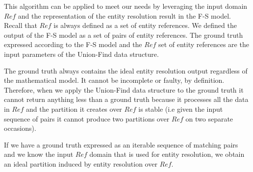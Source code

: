 This algorithm can be applied to meet our needs by leveraging the input domain
$Ref$ and the representation of the entity resolution result in the F-S model.
Recall that $Ref$ is always defined as a set of entity references.
We defined the output of the F-S model as a set of pairs of entity
references.
The ground truth expressed according to the F-S model and the $Ref$ set of
entity references are the input parameters of the Union-Find data structure.

The ground truth always contains the ideal entity resolution output
regardless of the mathematical model.
It cannot be incomplete or faulty, by definition.
Therefore, when we apply the Union-Find data structure to the ground truth
it cannot return anything less than a ground truth because it processes all
the data in $Ref$ and the partition it creates over $Ref$ is stable (i.e
given the input sequence of pairs it cannot produce two partitions over $Ref$
on two separate occasions).

If we have a ground truth expressed as an iterable sequence of matching
pairs and we know the input $Ref$ domain that is used for entity resolution,
we obtain an ideal partition induced by entity resolution over $Ref$.
